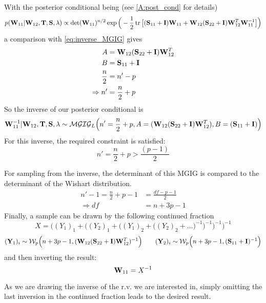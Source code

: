 With the posterior conditional being (see \autoref{A:post_cond} for details)
\[
	p(\mathbf{W}_{11} | \mathbf{W}_{12}, \mathbf{T}, \mathbf{S}, \lambda)
	\propto
	\det(\mathbf{W}_{11})^{n/2}
	\exp \Big(
	-\frac{1}{2} \operatorname{tr}\big[
		(\mathbf{S}_{11}+ \mathbf{I})\mathbf{W}_{11} + \mathbf{W}_{12}(\mathbf{S}_{22}+\mathbf{I})\mathbf{W}_{12}^T \mathbf{W}_{11}^{-1}
	\big]
	\Big)
\]
a comparison with \autoref{eq:inverse_MGIG} gives
\begin{align*}
	A              & =  \mathbf{W}_{12}(\mathbf{S}_{22}+\mathbf{I})\mathbf{W}_{12}^T 
	\\
	B              & = \mathbf{S}_{11}+ \mathbf{I}                               
	\\
	\frac{n}{2}    & = n'-p                                                  \\
	\Rightarrow n' & = \frac{n}{2}+p                                         
\end{align*}
So the inverse of our posterior conditional is
$$
\mathbf{W}_{11}^{-1} | \mathbf{W}_{12}, \mathbf{T}, \mathbf{S}, \lambda \sim \mathcal{MGIG}_L\Big(n'=\frac{n}{2}+p, A=(\mathbf{W}_{12}(\mathbf{S}_{22}+\mathbf{I})\mathbf{W}_{12}^T), B=(\mathbf{S}_{11}+ \mathbf{I}) \Big)
$$
For this inverse, the required constraint is satisfied:
$$
n' = \frac{n}{2}+p > \frac{(p-1)}{2}
$$

For sampling from the inverse, the determinant of this \gls{MGIG} is compared to the determinant of the Wishart distribution.
\begin{align*}
	n'-1=\frac{n}{2}+p-1 & = \frac{df-p-1}{2} 
	\\
	\Rightarrow df       & = n+3p-1           
\end{align*}
Finally, a sample can be drawn by the following continued fraction
$$
X = \Big((Y_1)_1 + 
\Big((Y_2)_1 + 
\Big( (Y_1)_2 + 
\Big( (Y_2)_2 + \dots \Big)^{-1} 
\Big)^{-1} 
\Big)^{-1}
\Big)^{-1}
$$
$$
(\mathbf{Y}_1)_i 
\sim 
\mathcal{W}_p
\Big(
n+3p-1, 
(\mathbf{W}_{12}(\mathbf{S}_{22}+\mathbf{I})\mathbf{W}_{12}^T)^{-1}
\Big)
\quad \quad
(\mathbf{Y}_2)_i 
\sim 
\mathcal{W}_p 
\Big(
n+3p-1, 
(\mathbf{S}_{11}+\mathbf{I})^{-1}
\Big)
$$
and then inverting the result:
$$
\mathbf{W}_{11} = {X}^{-1}
$$

As we are drawing the inverse of the r.v. we are interested in, simply omitting the last inversion in the continued fraction leads to the desired result.
